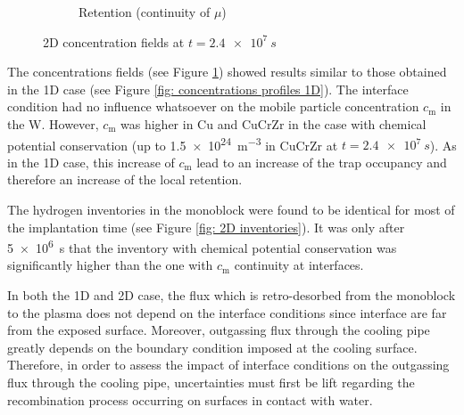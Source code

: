 \begin{figure} [p]
\begin{subfigure}{0.35\linewidth}
        \caption{Retention (continuity of $\mu$)}
    \end{subfigure}
    \caption{2D concentration fields at $t=\SI{2.4e7}{s}$}
    \label{fig: concentrations fields 2d}
\end{figure}

The concentrations fields (see Figure \ref{fig: concentrations fields 2d}) showed results similar to those obtained in the 1D case (see Figure \ref{fig: concentrations profiles 1D}).
The interface condition had no influence whatsoever on the mobile particle concentration $c_\mathrm{m}$ in the W.
However, $c_\mathrm{m}$ was higher in Cu and CuCrZr in the case with chemical potential conservation (up to \SI{1.5e24}{m^{-3}} in CuCrZr at $t=\SI{2.4e7}{s}$).
As in the 1D case, this increase of $c_\mathrm{m}$ lead to an increase of the trap occupancy and therefore an increase of the local retention.

The hydrogen inventories in the monoblock were found to be identical for most of the implantation time (see Figure \ref{fig: 2D inventories}).
It was only after \SI{5e6}{s} that the inventory with chemical potential conservation was significantly higher than the one with $c_\mathrm{m}$ continuity at interfaces.

In both the 1D and 2D case, the flux which is retro-desorbed from the monoblock to the plasma does not depend on the interface conditions since interface are far from the exposed surface.
Moreover, outgassing flux through the cooling pipe greatly depends on the boundary condition imposed at the cooling surface.
Therefore, in order to assess the impact of interface conditions on the outgassing flux through the cooling pipe, uncertainties must first be lift regarding the recombination process occurring on surfaces in contact with water.

